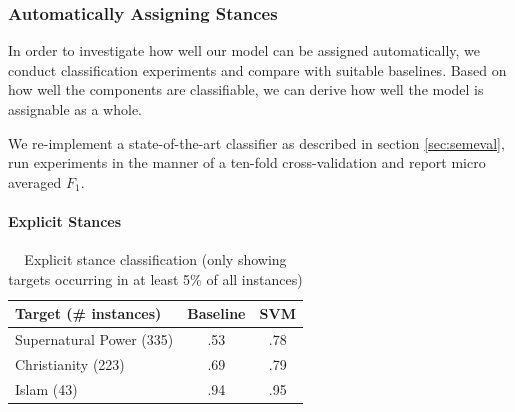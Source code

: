 \documentclass[11pt]{article}
\begin{document}
\subsubsection{Automatically Assigning Stances}
In order to investigate how well our model can be assigned automatically, we conduct classification experiments and compare with suitable baselines.
Based on how well the components are classifiable, we can derive how well the model is assignable as a whole.

We re-implement a state-of-the-art classifier as described in section \ref{sec:semeval}, run experiments in the manner of a ten-fold cross-validation and report micro averaged $F_1$.

\paragraph{Explicit Stances}

\begin{table}
\small
\centering
\begin{tabular}{lcc}
\toprule
\textbf{Target (\# instances)} & \textbf{Baseline}   & \textbf{SVM}    \\
\midrule
Supernatural Power (335)     & .53 & .78\\
Christianity (223)           & .69 & .79\\
Islam (43)                   & .94 & .95 \\
\bottomrule
\end{tabular}
\caption{Explicit stance classification (only showing targets occurring in at least 5\% of all instances)}
\label{table:classificationExplicitStances}
\end{table}
\end{document}
